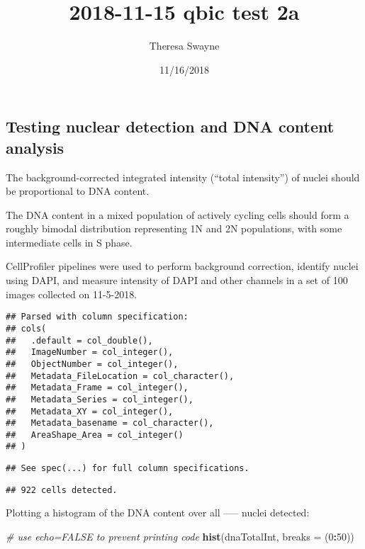 \documentclass[]{article}
\title{2018-11-15 qbic test 2a}
\author{Theresa Swayne}
\date{11/16/2018}
\newenvironment{Shaded}{\begin{snugshade}}{\end{snugshade}}
\newcommand{\KeywordTok}[1]{\textcolor[rgb]{0.13,0.29,0.53}{\textbf{#1}}}
\newcommand{\DataTypeTok}[1]{\textcolor[rgb]{0.13,0.29,0.53}{#1}}
\newcommand{\DecValTok}[1]{\textcolor[rgb]{0.00,0.00,0.81}{#1}}
\newcommand{\CommentTok}[1]{\textcolor[rgb]{0.56,0.35,0.01}{\textit{#1}}}
\newcommand{\OperatorTok}[1]{\textcolor[rgb]{0.81,0.36,0.00}{\textbf{#1}}}
\newcommand{\NormalTok}[1]{#1}
\begin{document}
\maketitle

\subsection{Testing nuclear detection and DNA content
analysis}\label{testing-nuclear-detection-and-dna-content-analysis}

The background-corrected integrated intensity (``total intensity'') of
nuclei should be proportional to DNA content.

The DNA content in a mixed population of actively cycling cells should
form a roughly bimodal distribution representing 1N and 2N populations,
with some intermediate cells in S phase.

CellProfiler pipelines were used to perform background correction,
identify nuclei using DAPI, and measure intensity of DAPI and other
channels in a set of 100 images collected on 11-5-2018.

\begin{verbatim}
## Parsed with column specification:
## cols(
##   .default = col_double(),
##   ImageNumber = col_integer(),
##   ObjectNumber = col_integer(),
##   Metadata_FileLocation = col_character(),
##   Metadata_Frame = col_integer(),
##   Metadata_Series = col_integer(),
##   Metadata_XY = col_integer(),
##   Metadata_basename = col_character(),
##   AreaShape_Area = col_integer()
## )
\end{verbatim}

\begin{verbatim}
## See spec(...) for full column specifications.
\end{verbatim}

\begin{verbatim}
## 922 cells detected.
\end{verbatim}

Plotting a histogram of the DNA content over all ----- nuclei detected:

\begin{Shaded}
\begin{Highlighting}[]
\CommentTok{# use echo=FALSE to prevent printing code}
\KeywordTok{hist}\NormalTok{(dnaTotalInt, }\DataTypeTok{breaks =}\NormalTok{ (}\DecValTok{0}\OperatorTok{:}\DecValTok{50}\NormalTok{))}
\end{Highlighting}
\end{Shaded}
\end{document}
